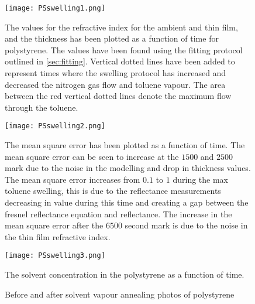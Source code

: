 \documentclass[MasterThesisMain.tex]{subfiles}
\begin{document}
\begin{figure}
\centering
\texttt{[image: PSswelling1.png]}
\caption{The values for the refractive index for the ambient and thin film, and the thickness has been plotted as a function of time for polystyrene. The values have been found using the fitting protocol outlined in \ref{sec:fitting}. Vertical dotted lines have been added to represent times where the swelling protocol has increased and decreased the nitrogen gas flow and toluene vapour. The area between the red vertical dotted lines denote the maximum flow through the toluene.}
\label{fig:PSswelling1}
\end{figure}


\begin{figure}
\centering
\texttt{[image: PSswelling2.png]}
\caption{The mean square error has been plotted as a function of time. The mean square error can be seen to increase at the $1500$ and $2500$ mark due to the noise in the modelling and drop in thickness values. The mean square error increases from $0.1$ to $1$ during the max toluene swelling, this is due to the reflectance measurements decreasing in value during this time and creating a gap between the fresnel reflectance equation and reflectance. The increase in the mean square error after the $6500$ second mark is due to the noise in the thin film refractive index.}
\label{fig:PSswelling2}
\end{figure}

\begin{figure}
\centering
\texttt{[image: PSswelling3.png]}
\caption{The solvent concentration in the polystyrene as a function of time.}
\label{fig:PSswelling3}
\end{figure}

\begin{figure}
\centering     
{}
\caption{Before and after solvent vapour annealing photos of polystyrene}
\end{figure}
	
\end{document}
